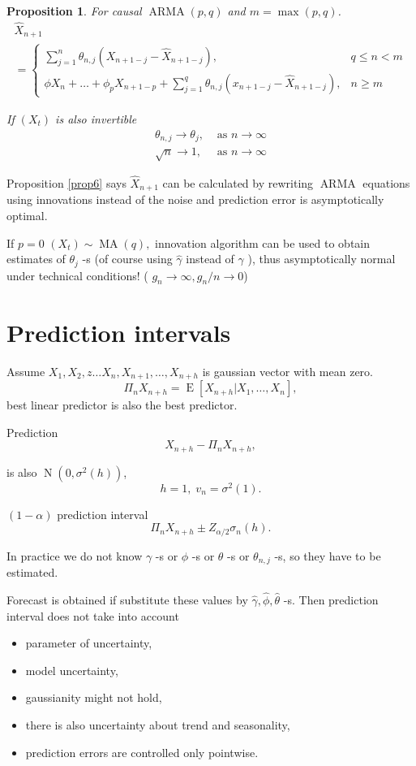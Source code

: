 \documentclass[12pt,a4paper, notitlepage]{book}
\theoremstyle{definition} %
\theoremstyle{plain} %
\newtheorem{proposition}[definition]{Proposition}
\DeclareMathOperator{\E}{E}
\DeclareMathOperator{\No}{N}
\DeclareMathOperator{\Arma}{ARMA}
\DeclareMathOperator{\Ma}{MA}
\begin{document}
\begin{proposition}
For causal $ \Arma(p,q) $ and $ m = \max(p,q) $.
\begin{align*} \hat{X}_{n+1} \\ = 
 \begin{cases} 
\sum_{j=1}^n \theta_{n,j} (X_{n+1-j} - \hat{X}_{n+1-j} ) , & q \leq n <m \\
\phi X_n + \ldots + \phi _p X_{n+1-p} + \sum _{j=1}^q \theta_{n,j}\left( x_{n+1-j} - \hat{X}_{n+1-j} \right) , & n \geq m 
\end{cases}
\end{align*}

If $ (X_t) $ is also invertible
 \begin{align*}
\theta_{n,j} \to \theta _j, & \text{ as } n \to \infty \\
\sqrt{n} \to 1 , & \text{ as } n \to \infty 
\end{align*}
\label{prop:6}
\end{proposition}

Proposition \ref{prop6} says $ \hat{X} _{n+1} $ can be calculated by rewriting $ \Arma $ equations using 
innovations instead of the noise
and prediction error is asymptotically optimal.

If $ p= 0 $  $(X_t) \sim \Ma(q) , $ innovation algorithm can be used to
obtain estimates of  $ \theta_j$ -s (of course using $ \hat{\gamma} $ instead of $ \gamma $ ),
thus asymptotically normal under technical conditions!
( $ g_n \to \infty , g_n/n \to 0 $)


\section{ Prediction intervals}

Assume  $ X_1, X_2, z\ldots X_n, X_{n+1}, \ldots , X_{n+h} $ is gaussian vector with mean zero.
\[ \Pi_n X_{n+h} = \E[ X_{n+h} | X_1, \ldots , X_n ] , \]
best linear predictor is also the best predictor.

Prediction
\[ X_{n+h} - \Pi _n X_{n+h} , \]
 
is also $ \No(0, \sigma^2(h)) $,
\[ h=1, \; v_n = \sigma^2(1) . \]

$(1- \alpha) $ prediction interval
\[ \Pi _n X_{n+h} \pm Z_{\alpha/2} \sigma_n(h)  . \]

In practice we do not know $ \gamma $ -s or $ \phi $ -s or $ \theta $ -s or $ \theta_{n,j} $ -s,
so they have to be estimated.

Forecast is obtained if substitute these values by $ \hat{\gamma}, \hat{\phi}, \hat{\theta}$ -s.
Then prediction interval does not take into account
\begin{itemize}
\item parameter of uncertainty,
\item model uncertainty,
\item gaussianity might not hold,
\item there is also uncertainty about trend and seasonality,
\item prediction errors are controlled only pointwise.
\end{itemize}
\end{document}
